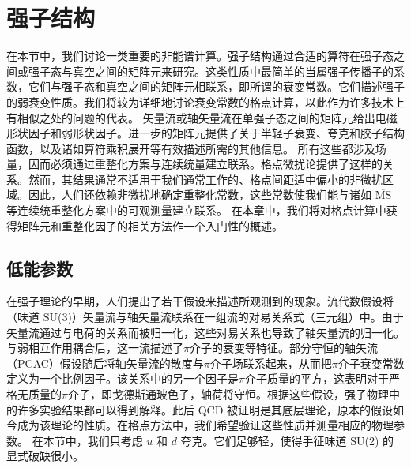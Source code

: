 \chapter{强子结构}

在本节中，我们讨论一类重要的非能谱计算。强子结构通过合适的算符在强子态之间或强子态与真空之间的矩阵元来研究。这类性质中最简单的当属强子传播子的系数，它们与强子态和真空之间的矩阵元相联系，即所谓的衰变常数。它们描述强子的弱衰变性质。我们将较为详细地讨论衰变常数的格点计算，以此作为许多技术上有相似之处的问题的代表。
矢量流或轴矢量流在单强子态之间的矩阵元给出电磁形状因子和弱形状因子。进一步的矩阵元提供了关于半轻子衰变、夸克和胶子结构函数，以及诸如算符乘积展开等有效描述所需的其他信息。
所有这些都涉及场量，因而必须通过重整化方案与连续统量建立联系。格点微扰论提供了这样的关系。然而，其结果通常不适用于我们通常工作的、格点间距适中偏小的非微扰区域。因此，人们还依赖非微扰地确定重整化常数，这些常数使我们能与诸如 $\overline{\mathrm{MS}}$ 等连续统重整化方案中的可观测量建立联系。
在本章中，我们将对格点计算中获得矩阵元和重整化因子的相关方法作一个入门性的概述。

\section{低能参数}
在强子理论的早期，人们提出了若干假设来描述所观测到的现象。流代数假设将（味道 SU(3)）矢量流与轴矢量流联系在一组流的对易关系式（三元组）中。由于矢量流通过与电荷的关系而被归一化，这些对易关系也导致了轴矢量流的归一化。与弱相互作用耦合后，这一流描述了$\pi$介子的衰变等特征。部分守恒的轴矢流（PCAC）假设随后将轴矢量流的散度与$\pi$介子场联系起来，从而把$\pi$介子衰变常数定义为一个比例因子。该关系中的另一个因子是$\pi$介子质量的平方，这表明对于严格无质量的$\pi$介子，即戈德斯通玻色子，轴荷将守恒。根据这些假设，强子物理中的许多实验结果都可以得到解释。此后 QCD 被证明是其底层理论，原本的假设如今成为该理论的性质。在格点方法中，我们希望验证这些性质并测量相应的物理参数。
在本节中，我们只考虑 $u$ 和 $d$ 夸克。它们足够轻，使得手征味道 SU(2) 的显式破缺很小。

